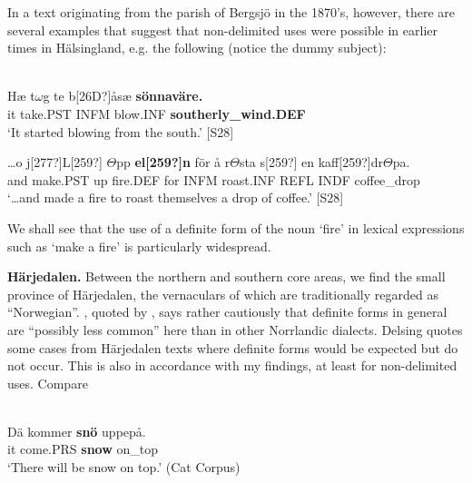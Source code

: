 \z

In a text originating from the parish of Bergsjö in the 1870’s, however, there are several examples that suggest that non-delimited uses were possible in earlier times in Hälsingland, e.g. the following (notice the dummy subject):


\ea\label{}
\\
\gll Hæ  t$\omega $g  te  b[26D?]åsæ  \textbf{sönnaväre.}\\
it  take.PST  INFM  blow.INF  \textbf{southerly\_wind.DEF}\\
\glt ‘It started blowing from the south.’ [S28]

\z

\ea
\gll …o  j[277?]L[259?]  $\Theta $pp  \textbf{el[259?]n} för  å  r$\Theta $sta  s[259?]  en  kaff[259?]dr$\Theta $pa.\\
and  make.PST  up  fire.DEF  for  INFM  roast.INF  REFL  INDF  coffee\_drop\\
\glt ‘…and made a fire to roast themselves a drop of coffee.’ [S28]

\z

We shall see that the use of a definite form of the noun ‘fire’ in lexical expressions such as ‘make a fire’ is particularly widespread.


\textbf{Härjedalen.} Between the northern and southern core areas, we find the small province of Härjedalen, the vernaculars of which are traditionally regarded as “Norwegian”. \citet[28]{Reinhammar1973}, quoted by \citet[19]{Delsing2003a}, says rather cautiously that definite forms in general are “possibly less common” here than in other Norrlandic dialects. Delsing quotes some cases from Härjedalen texts where definite forms would be expected but do not occur. This is also in accordance with my findings, at least for non-delimited uses. Compare


\ea \label{} 
\\
\gll Dä  kommer  \textbf{snö} uppepå.\\
it  come.PRS  \textbf{snow} on\_top\\
\glt ‘There will be snow on top.’ (Cat Corpus)


